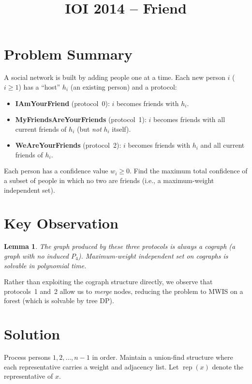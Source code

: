 \documentclass[11pt,a4paper]{article}
\title{IOI 2014 -- Friend}
\author{}
\date{}
\newtheorem{lemma}[theorem]{Lemma}
\begin{document}
\maketitle

\section{Problem Summary}

A social network is built by adding people one at a time. Each new person $i$ ($i \ge 1$) has a ``host'' $h_i$ (an existing person) and a protocol:
\begin{itemize}
  \item \textbf{IAmYourFriend} (protocol~0): $i$ becomes friends with $h_i$.
  \item \textbf{MyFriendsAreYourFriends} (protocol~1): $i$ becomes friends with all current friends of $h_i$ (but \emph{not} $h_i$ itself).
  \item \textbf{WeAreYourFriends} (protocol~2): $i$ becomes friends with $h_i$ and all current friends of $h_i$.
\end{itemize}

Each person has a confidence value $w_i \ge 0$. Find the maximum total confidence of a subset of people in which no two are friends (i.e., a maximum-weight independent set).

\section{Key Observation}

\begin{lemma}
The graph produced by these three protocols is always a \emph{cograph} (a graph with no induced $P_4$). Maximum-weight independent set on cographs is solvable in polynomial time.
\end{lemma}

Rather than exploiting the cograph structure directly, we observe that protocols~1 and~2 allow us to \emph{merge} nodes, reducing the problem to MWIS on a forest (which is solvable by tree DP).

\section{Solution}

Process persons $1, 2, \ldots, n-1$ in order. Maintain a union-find structure where each representative carries a weight and adjacency list. Let $\operatorname{rep}(x)$ denote the representative of $x$.
\end{document}
